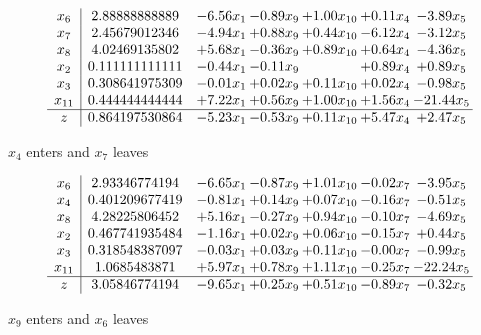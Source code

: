 \documentclass[8pt]{article}
\begin{document}
 \[\begin{array}{c| c c@{\hskip 2pt} c@{\hskip 2pt} c@{\hskip 2pt} c@{\hskip 2pt} c@{\hskip 2pt} }
 x_{6}   &  2.88888888889 & -6.56 x_{1} & -0.89 x_{9} & +  1.00 x_{10} & +  0.11 x_{4} & -3.89 x_{5}\\
 x_{7}   &  2.45679012346 & -4.94 x_{1} & +  0.88 x_{9} & +  0.44 x_{10} & -6.12 x_{4} & -3.12 x_{5}\\
 x_{8}   &  4.02469135802 & +  5.68 x_{1} & -0.36 x_{9} & +  0.89 x_{10} & +  0.64 x_{4} & -4.36 x_{5}\\
 x_{2}   &  0.111111111111 & -0.44 x_{1} & -0.11 x_{9} &   & +  0.89 x_{4} & +  0.89 x_{5}\\
 x_{3}   &  0.308641975309 & -0.01 x_{1} & +  0.02 x_{9} & +  0.11 x_{10} & +  0.02 x_{4} & -0.98 x_{5}\\
 x_{11}   &  0.444444444444 & +  7.22 x_{1} & +  0.56 x_{9} & +  1.00 x_{10} & +  1.56 x_{4} & -21.44 x_{5}\\
\hline
z    &  0.864197530864 & -5.23 x_{1} & -0.53 x_{9} & +  0.11 x_{10} & +  5.47 x_{4} & +  2.47 x_{5}\\
\end{array}\]


 $ x_{4} $ enters and $ x_{7} $ leaves 

 \[\begin{array}{c| c c@{\hskip 2pt} c@{\hskip 2pt} c@{\hskip 2pt} c@{\hskip 2pt} c@{\hskip 2pt} }
 x_{6}   &  2.93346774194 & -6.65 x_{1} & -0.87 x_{9} & +  1.01 x_{10} & -0.02 x_{7} & -3.95 x_{5}\\
 x_{4}   &  0.401209677419 & -0.81 x_{1} & +  0.14 x_{9} & +  0.07 x_{10} & -0.16 x_{7} & -0.51 x_{5}\\
 x_{8}   &  4.28225806452 & +  5.16 x_{1} & -0.27 x_{9} & +  0.94 x_{10} & -0.10 x_{7} & -4.69 x_{5}\\
 x_{2}   &  0.467741935484 & -1.16 x_{1} & +  0.02 x_{9} & +  0.06 x_{10} & -0.15 x_{7} & +  0.44 x_{5}\\
 x_{3}   &  0.318548387097 & -0.03 x_{1} & +  0.03 x_{9} & +  0.11 x_{10} & -0.00 x_{7} & -0.99 x_{5}\\
 x_{11}   &  1.0685483871 & +  5.97 x_{1} & +  0.78 x_{9} & +  1.11 x_{10} & -0.25 x_{7} & -22.24 x_{5}\\
\hline
z    &  3.05846774194 & -9.65 x_{1} & +  0.25 x_{9} & +  0.51 x_{10} & -0.89 x_{7} & -0.32 x_{5}\\
\end{array}\]


 $ x_{9} $ enters and $ x_{6} $ leaves 
\end{document}
